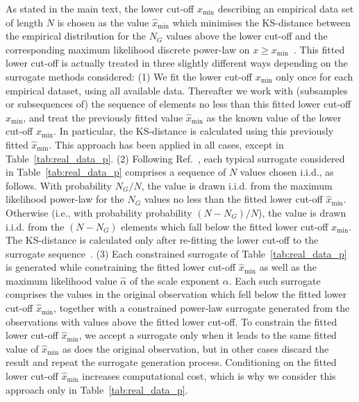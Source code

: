 \documentclass[%
prx,
reprint,
superscriptaddress,
nofootinbib,
 amsmath,amssymb,
 aps,
floatfix,
]{revtex4-2}
\begin{document}
{As stated in the main text, the lower cut-off $x_{\min}$ describing an empirical data set of length $N$ is chosen as the value $\hat{x}_{\min}$ which minimises the KS-distance between the empirical distribution for the $N_G$ values above the lower cut-off and the corresponding maximum likelihood discrete power-law on $x \geq x_{\min}$~\cite{bauke2007parameter,clauset2009power,broido2019scale}. This fitted lower cut-off is actually treated in three slightly different ways depending on the surrogate methods considered:
{(1) We fit the lower cut-off $x_{\min}$ only once for each empirical dataset, using all available data. Thereafter we work with (subsamples or subsequences of) the sequence of elements no less than this fitted lower cut-off $\hat{x}_{\min}$, and treat the previously fitted value $\hat{x}_{\min}$ as the known value of the lower cut-off $x_{\min}$. In particular, the KS-distance is calculated using this previously fitted $\hat{x}_{\min}$. This approach has been applied in all cases, except in Table~\ref{tab:real_data_p}. %
}
(2) Following Ref.~\cite{clauset2009power}, each typical surrogate considered in Table~\ref{tab:real_data_p} comprises a sequence of $N$ values chosen i.i.d., as follows. With probability $N_G/N$, the value is drawn i.i.d. from the maximum likelihood power-law for the $N_G$ values no less than the fitted lower cut-off $\hat{x}_{\min}$. Otherwise (i.e., with probability probability $\left( N- N_G\right)/N$), the value is drawn i.i.d. from the $\left( N - N_G\right)$ elements which fall below the fitted lower cut-off $x_{\min}$. The KS-distance is calculated only after re-fitting the lower cut-off to the surrogate sequence~\cite{clauset2009power}. (3) Each constrained surrogate of Table~\ref{tab:real_data_p} is generated while constraining the fitted lower cut-off $\hat{x}_{\min}$ as well as the maximum likelihood value $\hat{\alpha}$ of the scale exponent $\alpha$. Each such} surrogate comprises the values in the original observation which fell below the fitted lower cut-off $\hat{x}_{\min}$, together with a constrained power-law surrogate generated from the observations with values above the fitted lower cut-off. {To constrain the fitted lower cut-off $\hat{x}_{\min}$}, we accept a surrogate only when it leads to the same fitted value of $\hat{x}_{\min}$ as does the original observation, but in other cases discard the result and repeat the surrogate generation process. {Conditioning} on the fitted lower cut-off $\hat{x}_{\min}$ increases computational cost, {which is why we consider this approach only in Table~\ref{tab:real_data_p}. %
} 
\end{document}
